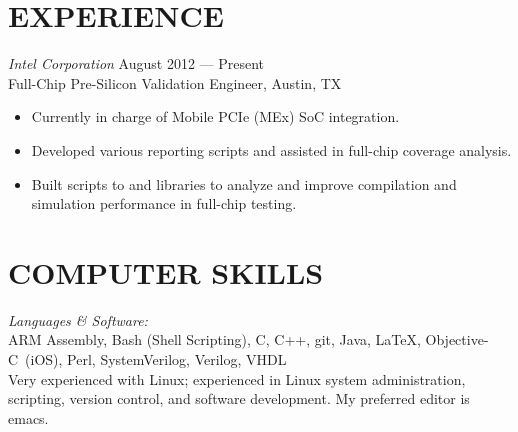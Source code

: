 \documentclass[margin]{res}
\begin{document}
\begin{resume}
  \section{EXPERIENCE} {\sl Intel Corporation} 
  \hfill August 2012 --- Present \\
  Full-Chip Pre-Silicon Validation Engineer, Austin, TX
  \vspace{0.25em}
  \begin{itemize}
  \item Currently in charge of Mobile PCIe (MEx) SoC integration.
  \item Developed various reporting scripts and assisted in full-chip
    coverage analysis.
  \item Built scripts to and libraries to analyze and improve
    compilation and simulation performance in full-chip testing.
  \end{itemize}

  \section{COMPUTER SKILLS} 
  {\sl Languages \& Software:} \\
  ARM Assembly, Bash (Shell Scripting), C, C++, git, Java, \LaTeX,
  \mbox{Objective-C (iOS)}, Perl, SystemVerilog, Verilog, VHDL
  \vspace{0.5em}\\
  Very experienced with Linux; experienced in Linux system
  administration, scripting, version control, and software
  development. My preferred editor is emacs.


\end{resume}
\end{document}
